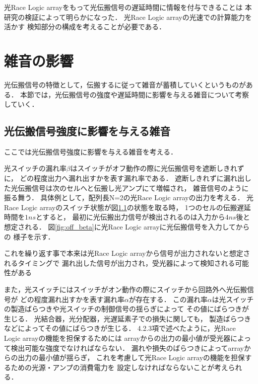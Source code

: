 光Race Logic arrayをもって光伝搬信号の遅延時間に情報を付与できることは
本研究の検証によって明らかになった．
光Race Logic arrayの光速での計算能力を活かす
検知部分の構成を考えることが必要である．

\section{雑音の影響}
光伝搬信号の特徴として，伝搬するに従って雑音が蓄積していくというものがある．
本節では，光伝搬信号の強度や遅延時間に影響を与える雑音について考察していく．
\subsection{光伝搬信号強度に影響を与える雑音}
ここでは光伝搬信号強度に影響を与える雑音を考える．

光スイッチの漏れ率$\beta$はスイッチがオフ動作の際に光伝搬信号を遮断しきれずに，
どの程度出力へ漏れ出すかを表す漏れ率である．
遮断しきれずに漏れ出した光伝搬信号は次のセルへと伝搬し光アンプにて増幅され，
雑音信号のように振る舞う．
具体例として，配列長N=2の光Race Logic arrayの出力を考える．
光Race Logic arrayのスイッチ状態が図\ref{}の状態を取る時，
1つのセルの伝搬遅延時間を$1ns$とすると，
最初に光伝搬出力信号が検出されるのは入力から$4ns$後と想定される．
図\ref{fig:off_beta}に光Race Logic arrayに光伝搬信号を入力してからの
様子を示す．

これを繰り返す事で本来は光Race Logic arrayから信号が出力されないと想定されるタイミングで
漏れ出した信号が出力され，受光器によって検知される可能性がある

また，光スイッチにはスイッチがオン動作の際にスイッチから回路外へ光伝搬信号が
どの程度漏れ出すかを表す漏れ率$\alpha$が存在する．
この漏れ率$\alpha$は光スイッチの製造ばらつきや光スイッチの制御信号の揺らぎによって
その値にばらつきが生じる．
光結合器，光分配器，光遅延素子での損失に関しても，
製造ばらつきなどによってその値にばらつきが生じる．
4.2.3項で述べたように，光Race Logic arrayの機能を担保するためには
arrayからの出力の最小値が受光器によって検出可能な強度でなければならない．
漏れや損失のばらつきによってarrayからの出力の最小値が揺らぎ，
これを考慮して光Race Logic arrayの機能を担保するための光源・アンプの消費電力を
設定しなければならないことが考えられる．

